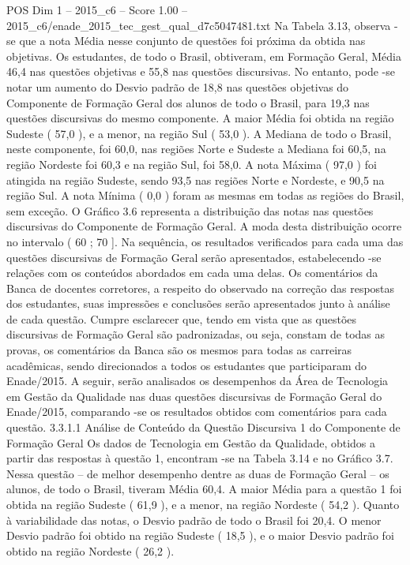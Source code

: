 \begin{textsample}{POS Dim 1 – 2015\_c6 – Score 1.00 – 2015\_c6/enade\_2015\_tec\_gest\_qual\_d7c5047481.txt}
Na Tabela 3.13, observa -se que a nota Média nesse conjunto de questões foi próxima da obtida nas objetivas.
Os estudantes, de todo o Brasil, obtiveram, em Formação Geral, Média 46,4 nas questões objetivas e 55,8 nas questões discursivas.
No entanto, pode -se notar um aumento do Desvio padrão de 18,8 nas questões objetivas do Componente de Formação Geral dos alunos de todo o Brasil, para 19,3 nas questões discursivas do mesmo componente.
A maior Média foi obtida na região Sudeste ( 57,0 ), e a menor, na região Sul ( 53,0 ).
A Mediana de todo o Brasil, neste componente, foi 60,0, nas regiões Norte e Sudeste a Mediana foi 60,5, na região Nordeste foi 60,3 e na região Sul, foi 58,0.
A nota Máxima ( 97,0 ) foi atingida na região Sudeste, sendo 93,5 nas regiões Norte e Nordeste, e 90,5 na região Sul.
A nota Mínima ( 0,0 ) foram as mesmas em todas as regiões do Brasil, sem exceção.
O Gráfico 3.6 representa a distribuição das notas nas questões discursivas do Componente de Formação Geral.
A moda desta distribuição ocorre no intervalo ( 60 ; 70 ].
Na sequência, os resultados verificados para cada uma das questões discursivas de Formação Geral serão apresentados, estabelecendo -se relações com os conteúdos abordados em cada uma delas.
Os comentários da Banca de docentes corretores, a respeito do observado na correção das respostas dos estudantes, suas impressões e conclusões serão apresentados junto à análise de cada questão.
Cumpre esclarecer que, tendo em vista que as questões discursivas de Formação Geral são padronizadas, ou seja, constam de todas as provas, os comentários da Banca são os mesmos para todas as carreiras acadêmicas, sendo direcionados a todos os estudantes que participaram do Enade/2015.
A seguir, serão analisados os desempenhos da Área de Tecnologia em Gestão da Qualidade nas duas questões discursivas de Formação Geral do Enade/2015, comparando -se os resultados obtidos com comentários para cada questão. 3.3.1.1 Análise de Conteúdo da Questão Discursiva 1 do Componente de Formação Geral Os dados de Tecnologia em Gestão da Qualidade, obtidos a partir das respostas à questão 1, encontram -se na Tabela 3.14 e no Gráfico 3.7.
Nessa questão – de melhor desempenho dentre as duas de Formação Geral – os alunos, de todo o Brasil, tiveram Média 60,4.
A maior Média para a questão 1 foi obtida na região Sudeste ( 61,9 ), e a menor, na região Nordeste ( 54,2 ).
Quanto à variabilidade das notas, o Desvio padrão de todo o Brasil foi 20,4.
O menor Desvio padrão foi obtido na região Sudeste ( 18,5 ), e o maior Desvio padrão foi obtido na região Nordeste ( 26,2 ).

\end{textsample}
